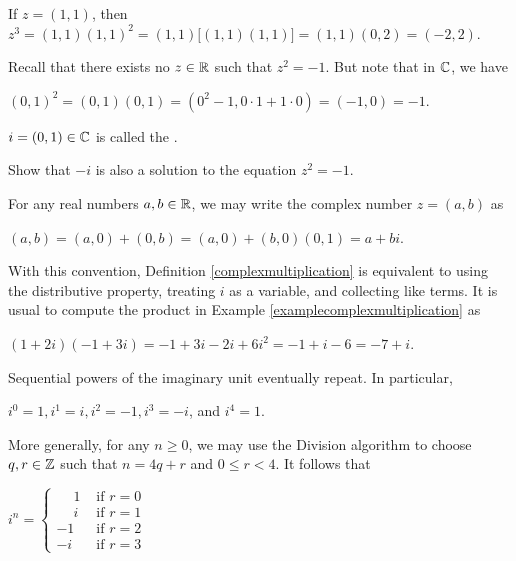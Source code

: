 \documentclass[11pt,fleqn,dvipsnames,usenames]{article}
\newcommand{\p}{\noindent}
\begin{document}
\begin{example}
If $z = (1,1)$, then $z^3 = (1,1)(1,1)^2 = (1,1)\big[(1,1)(1,1)\big] = (1,1)(0,2) = (-2, 2)$.
\end{example}
%
\observation Recall that there exists no $z\in\mathbb{R}$ such that $z^2 = -1$.  But note that in $\mathbb{C}$, we have
\begin{center}
$(0,1)^2 = (0,1)(0,1) = (0^2 - 1, 0\cdot 1 + 1\cdot 0) = (-1,0) = -1$.
\end{center}
\vsp

\terminology $i = (0,1)\in\mathbb{C}$ is called the .
\vsp

\begin{exercise}
Show that $-i$ is also a solution to the equation $z^{2} = -1$.
\end{exercise}

\notation For any real numbers $a,b\in\mathbb{R}$, we may write the complex number $z = (a,b)$ as
\begin{center}
$(a,b) = (a,0) + (0,b) = (a,0) + (b,0)(0,1) = a + bi$.
\end{center}
\vsp

\p With this convention, Definition \ref{complexmultiplication} is equivalent to using the distributive property, treating $i$ as a variable, and collecting like terms.  It is usual to compute the product in Example \ref{examplecomplexmultiplication} as
\begin{center}
$(1 + 2i)(-1 + 3i) = -1 + 3i - 2i + 6i^2 = -1 + i - 6 = -7 + i$.
\end{center}

\observation Sequential powers of the imaginary unit eventually repeat.  In particular,
\begin{center}
$i^{0} = 1, i^{1} = i, i^{2} = -1, i^{3} = -i$, and $i^{4} = 1$.
\end{center}

\p More generally, for any $n\geq 0$, we may use the Division algorithm to choose $q,r\in\mathbb{Z}$ such that $n = 4q + r$ and $0\leq r < 4$.  It follows that
\begin{center}
$i^{n} = \begin{cases}\phantom{-}1 & \text{ if } r = 0\\\phantom{-}i & \text{ if }r = 1\\-1 & \text{ if } r = 2\\-i & \text{ if }r = 3\end{cases}$
\end{center}
\vsp
\end{document}
